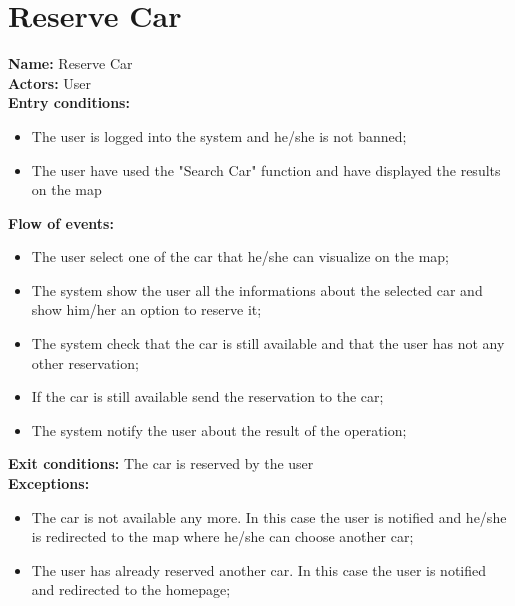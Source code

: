 \section*{Reserve Car}
\textbf{Name:} Reserve Car\\
\textbf{Actors:} User\\
\textbf{Entry conditions:}
 \begin{itemize}
\item The user is logged into the system and he/she is not banned;
\item The user have used the "Search Car" function and have displayed the results on the map
\end{itemize}
\textbf{Flow of events:}
\begin{itemize}
\item The user select one of the car that he/she can visualize on the map;
\item The system show the user all the informations about the selected car and show him/her an option to reserve it;
\item The system check that the car is still available and that the user has not any other reservation;
\item If the car is still available send the reservation to the car;
\item The system notify the user about the result of the operation;
\end{itemize}
\textbf{Exit conditions:} The car is reserved by the user  \\
\textbf{Exceptions:}
\begin{itemize}
\item The car is not available any more. In this case the user is notified and he/she is redirected to the map where he/she can choose another car;
\item The user has already reserved another car. In this case the user is notified and redirected to the homepage;
\end{itemize}


